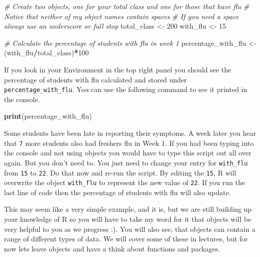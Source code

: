 \documentclass[
]{book}
\newenvironment{Shaded}{\begin{snugshade}}{\end{snugshade}}
\newcommand{\CommentTok}[1]{\textcolor[rgb]{0.56,0.35,0.01}{\textit{#1}}}
\newcommand{\DecValTok}[1]{\textcolor[rgb]{0.00,0.00,0.81}{#1}}
\newcommand{\FunctionTok}[1]{\textcolor[rgb]{0.13,0.29,0.53}{\textbf{#1}}}
\newcommand{\NormalTok}[1]{#1}
\newcommand{\OtherTok}[1]{\textcolor[rgb]{0.56,0.35,0.01}{#1}}
\newcommand{\SpecialCharTok}[1]{\textcolor[rgb]{0.81,0.36,0.00}{\textbf{#1}}}
\begin{document}
\begin{Shaded}
\begin{Highlighting}[]
\CommentTok{\# Create two objects, one for your total class and one for those that have flu}
\CommentTok{\# Notice that neither of my object names contain spaces}
\CommentTok{\# If you need a space always use an underscore or full stop}
\NormalTok{total\_class }\OtherTok{\textless{}{-}} \DecValTok{200}
\NormalTok{with\_flu }\OtherTok{\textless{}{-}} \DecValTok{15}

\CommentTok{\# Calculate the percentage of students with flu in week 1}
\NormalTok{percentage\_with\_flu }\OtherTok{\textless{}{-}}\NormalTok{ (with\_flu}\SpecialCharTok{/}\NormalTok{total\_class)}\SpecialCharTok{*}\DecValTok{100}
\end{Highlighting}
\end{Shaded}

If you look in your Environment in the top right panel you should see the percentage of students with flu calculated and stored under \texttt{percentage\_with\_flu}. You can use the following command to see it printed in the console.

\begin{Shaded}
\begin{Highlighting}[]
\FunctionTok{print}\NormalTok{(percentage\_with\_flu)}
\end{Highlighting}
\end{Shaded}

Some students have been late in reporting their symptoms. A week later you hear that \texttt{7} more students also had freshers flu in Week 1. If you had been typing into the console and not using objects you would have to type this script out all over again. But you don't need to. You just need to change your entry for \texttt{with\_flu} from \texttt{15} to \texttt{22}. Do that now and re-run the script. By editing the \texttt{15}, R will overwrite the object \texttt{with\_flu} to represent the new value of \texttt{22}. If you run the last line of code then the percentage of students with flu will also update.

This may seem like a very simple example, and it is, but we are still building up your knowledge of R so you will have to take my word for it that objects will be very helpful to you as we progress :). You will also see, that objects can contain a range of different types of data. We will cover some of these in lectures, but for now lets leave objects and have a think about functions and packages.
\end{document}
